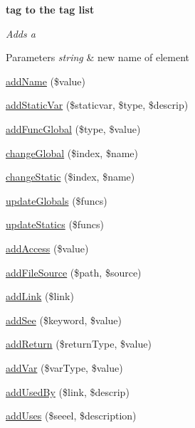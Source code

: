 \begin{Indent}{\bf tag to the tag list}\par
{\em \-Adds a 
\begin{DoxyParams}{\-Parameters}
{\em string} & new name of element \\
\hline
\end{DoxyParams}
}\begin{DoxyCompactItemize}
\item 
\hyperlink{classparser_doc_block_afb8c2d0af167ea909d1f5da587bf779c}{add\-Name} (\$value)
\item 
\hyperlink{classparser_doc_block_a4ffc0c544c81c6981ecc20ad5bcc0303}{add\-Static\-Var} (\$staticvar, \$type, \$descrip)
\item 
\hyperlink{classparser_doc_block_a94b230f5fe317e24883fcb3811d6c00a}{add\-Func\-Global} (\$type, \$value)
\item 
\hyperlink{classparser_doc_block_aa3a4a3d56234d87daace3b204354f8a3}{change\-Global} (\$index, \$name)
\item 
\hyperlink{classparser_doc_block_a0d444138243904bf459136d24ef70369}{change\-Static} (\$index, \$name)
\item 
\hyperlink{classparser_doc_block_a15fe7d697f61fe31c279a7cec40b428e}{update\-Globals} (\$funcs)
\item 
\hyperlink{classparser_doc_block_aacafc62933c3e3c56f35f45a9087ec7d}{update\-Statics} (\$funcs)
\item 
\hyperlink{classparser_doc_block_a22a31de72e71238fa3def6f29a4bffdf}{add\-Access} (\$value)
\item 
\hyperlink{classparser_doc_block_aca227ca13af0bf18ff21c0d777192d25}{add\-File\-Source} (\$path, \$source)
\item 
\hyperlink{classparser_doc_block_a98a8d4bb160fa73f965212bf5a384391}{add\-Link} (\$link)
\item 
\hyperlink{classparser_doc_block_a0928611dcf31eec107778caa0cde12ff}{add\-See} (\$keyword, \$value)
\item 
\hyperlink{classparser_doc_block_afe9b7bac8079106f68c7ec629f917ad7}{add\-Return} (\$return\-Type, \$value)
\item 
\hyperlink{classparser_doc_block_aa0e53274069060315dfbba501be798f9}{add\-Var} (\$var\-Type, \$value)
\item 
\hyperlink{classparser_doc_block_aba7363024e22dec3a9048ed802d31f7f}{add\-Used\-By} (\$link, \$descrip)
\item 
\hyperlink{classparser_doc_block_a21e4571aa0e1792ea3c41d77d8d03233}{add\-Uses} (\$seeel, \$description)

\end{DoxyCompactItemize}
\end{Indent}
